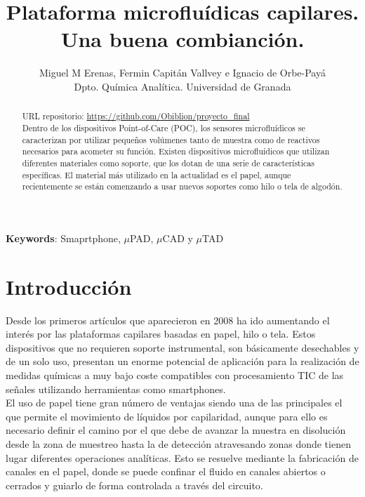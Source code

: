 \documentclass{article}
\title{Plataforma microfluídicas capilares.\\Una buena combianción.}
\author {Miguel M Erenas, Fermin Capitán Vallvey e Ignacio de Orbe-Payá\\
Dpto. Química Analítica. Universidad de Granada}
\begin{document}
	\maketitle
\begin{abstract}
URL repositorio: \url{https://github.com/Obiblion/proyecto_final}\\
Dentro de los dispositivos Point-of-Care (POC), los sensores microfluídicos se caracterizan por utilizar pequeños volúmenes tanto de muestra como de reactivos necesarios para acometer su función. Existen dispositivos microfluídicos que utilizan diferentes materiales como soporte, que los dotan de una serie de características específicas. El material más utilizado en la actualidad es el papel, aunque recientemente se están comenzando a usar nuevos soportes como hilo o tela de algodón.  
\end{abstract}
\textbf{Keywords}: Smaprtphone, $\mu$PAD, $\mu$CAD y $\mu$TAD



	
\section{Introducción}
Desde los primeros artículos que aparecieron en 2008\cite{Abe2008,Martinez2010} ha ido aumentando el interés por las plataformas capilares basadas en papel, hilo o tela. Estos dispositivos que no requieren soporte instrumental, son básicamente desechables y de un solo uso, presentan un enorme potencial de aplicación para la realización de medidas químicas a muy bajo coste compatibles con procesamiento TIC de las señales utilizando herramientas como smartphones.\\
 
El uso de papel tiene gran número de ventajas siendo una de las principales el que permite el movimiento de líquidos por capilaridad\cite{Cate2015}, aunque para ello es necesario definir el camino por el que debe de avanzar la muestra en disolución desde la zona de muestreo hasta la de detección atravesando zonas donde tienen lugar diferentes operaciones analíticas. Esto se resuelve mediante la fabricación de canales en el papel, donde se puede confinar el fluido en canales abiertos o cerrados y guiarlo de forma controlada a través del circuito\cite{Fenton2009}.\\
 
\end{document}
